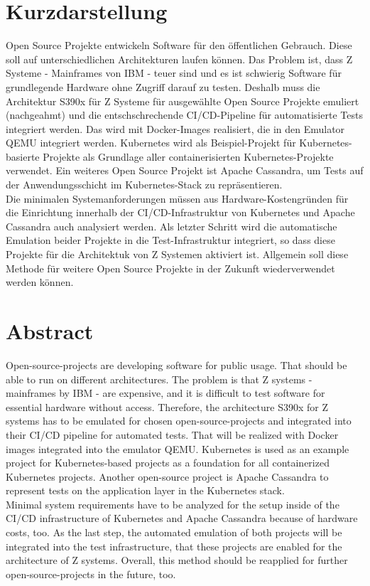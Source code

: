 \thispagestyle{empty}
\section*{Kurzdarstellung}
\label{sec:kurzdarstellung}
Open Source Projekte entwickeln Software für den öffentlichen Gebrauch. Diese soll auf unterschiedlichen Architekturen laufen können. Das Problem ist, dass Z Systeme - Mainframes von IBM - teuer sind und es ist schwierig Software für grundlegende Hardware ohne Zugriff darauf zu testen. Deshalb muss die Architektur S390x für Z Systeme für ausgewählte Open Source Projekte emuliert (nachgeahmt) und die entschschrechende CI/CD-Pipeline für automatisierte Tests integriert werden. Das wird mit Docker-Images realisiert, die in den Emulator QEMU integriert werden. Kubernetes wird als Beispiel-Projekt für Kubernetes-basierte Projekte als Grundlage aller containerisierten Kubernetes-Projekte verwendet. Ein weiteres Open Source Projekt ist Apache Cassandra, um Tests auf der Anwendungsschicht im Kubernetes-Stack zu repräsentieren. \\
Die minimalen Systemanforderungen müssen aus Hardware-Kostengründen für die Einrichtung innerhalb der CI/CD-Infrastruktur von Kubernetes und Apache Cassandra auch analysiert werden. Als letzter Schritt wird die automatische Emulation beider Projekte in die Test-Infrastruktur integriert, so dass diese Projekte für die Architektuk von Z Systemen aktiviert ist. Allgemein soll diese Methode für weitere Open Source Projekte in der Zukunft wiederverwendet werden können.



\section*{Abstract}
\label{sec:abstract}

Open-source-projects are developing software for public usage. That should be able to run on different architectures. The problem is that Z systems - mainframes by IBM - are expensive, and it is difficult to test software for essential hardware without access. Therefore, the architecture S390x for Z systems has to be emulated for chosen open-source-projects and integrated into their CI/CD pipeline for automated tests. That will be realized with Docker images integrated into the emulator QEMU. Kubernetes is used as an example project for Kubernetes-based projects as a foundation for all containerized Kubernetes projects. Another open-source project is Apache Cassandra to represent tests on the application layer in the
Kubernetes stack. \\
Minimal system requirements have to be analyzed for the setup inside of the CI/CD infrastructure of Kubernetes and Apache Cassandra because of hardware costs, too. As the last step, the automated emulation of both projects will be integrated into the test infrastructure, that these projects are enabled for the architecture of Z systems. Overall, this method should be
reapplied for further open-source-projects in the future, too.


